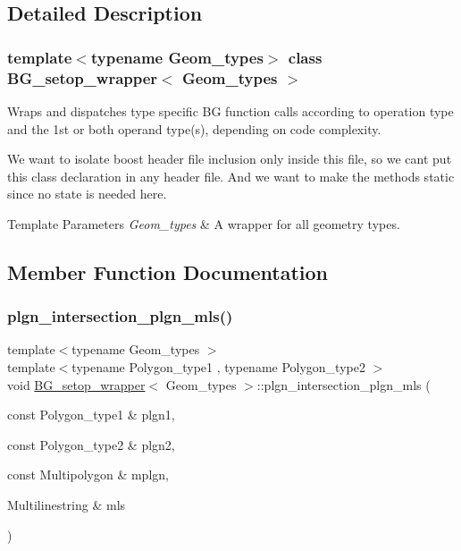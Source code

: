 \subsection{Detailed Description}
\subsubsection*{template$<$typename Geom\+\_\+types$>$\newline
class B\+G\+\_\+setop\+\_\+wrapper$<$ Geom\+\_\+types $>$}

Wraps and dispatches type specific BG function calls according to operation type and the 1st or both operand type(s), depending on code complexity.

We want to isolate boost header file inclusion only inside this file, so we can\textquotesingle{}t put this class declaration in any header file. And we want to make the methods static since no state is needed here. 
\begin{DoxyTemplParams}{Template Parameters}
{\em Geom\+\_\+types} & A wrapper for all geometry types. \\
\hline
\end{DoxyTemplParams}


\subsection{Member Function Documentation}
\mbox{\label{classBG__setop__wrapper_a489e69e0e979f5ffc27d6989cc73d3a3}} 
\subsubsection{\texorpdfstring{plgn\+\_\+intersection\+\_\+plgn\+\_\+mls()}{plgn\_intersection\_plgn\_mls()}}
{\footnotesize\ttfamily template$<$typename Geom\+\_\+types $>$ \\
template$<$typename Polygon\+\_\+type1 , typename Polygon\+\_\+type2 $>$ \\
void \mbox{\hyperlink{classBG__setop__wrapper}{B\+G\+\_\+setop\+\_\+wrapper}}$<$ Geom\+\_\+types $>$\+::plgn\+\_\+intersection\+\_\+plgn\+\_\+mls (\begin{DoxyParamCaption}\item[{const Polygon\+\_\+type1 \&}]{plgn1,  }\item[{const Polygon\+\_\+type2 \&}]{plgn2,  }\item[{const Multipolygon \&}]{mplgn,  }\item[{Multilinestring \&}]{mls }\end{DoxyParamCaption})\hspace{0.3cm}{\ttfamily [inline]}}

